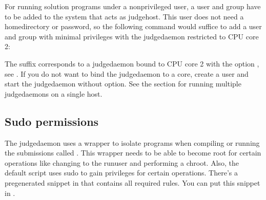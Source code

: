 \documentclass[a4paper,10pt,english,openany]{sphinxmanual}
\begin{document}
\begin{sphinxVerbatim}[commandchars=\\\{\}]
 
\end{sphinxVerbatim}

\sphinxAtStartPar
For running solution programs under a non\sphinxhyphen{}privileged user, a user and group have
to be added to the system that acts as judgehost. This user does not
need a home\sphinxhyphen{}directory or password, so the following command would
suffice to add a user and group  with minimal privileges
with the judgedaemon restricted to CPU core 2:

\begin{sphinxVerbatim}[commandchars=\\\{\}]
  
         
\end{sphinxVerbatim}

\sphinxAtStartPar
The  suffix corresponds to a judgedaemon bound to CPU core 2
with the option , see {\hyperref[\detokenize{install-judgehost:start-judgedaemon}]{}}. If you do not
want to bind the judgedaemon to a core, create a user 
and start the judgedaemon without  option.
See the section {\hyperref[\detokenize{config-advanced:multiple-judgedaemons}]{}} for running multiple
judgedaemons on a single host.


\subsection{Sudo permissions}
\label{\detokenize{install-judgehost:sudo-permissions}}
\sphinxAtStartPar
The judgedaemon uses a wrapper to isolate programs when compiling
or running the submissions called . This wrapper needs
to be able to become root for certain operations like changing to the
runuser and performing a chroot. Also, the default
 script uses sudo to gain privileges for
certain operations. There’s a pregenerated snippet
in  that contains all required rules. You can
put this snippet in .
\end{document}

